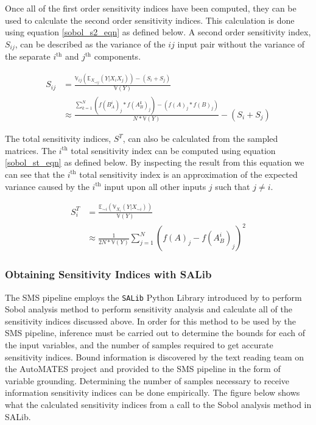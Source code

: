 Once all of the first order sensitivity indices have been computed, they can be used to calculate the second order sensitivity indices. This calculation is done using equation \ref{sobol_s2_eqn} as defined below. A second order sensitivity index, $S_{ij}$, can be described as the variance of the $ij$ input pair without the variance of the separate $i^{\text{th}}$ and $j^{\text{th}}$ components.

\begin{equation} \label{sobol_s2_eqn}
  \begin{split}
    S_{ij} & = \frac{\mathbb{V}_{ij}\left(\mathbb{E}_{X_{\sim ij}}(Y | X_i X_j)\right)  - (S_i + S_j)}{\mathbb{V}(Y)} \\
     & \approx \frac{\sum_{k=1}^{N} \left(f(B_{A}^{i})_j * f(A_{B}^{k})_j\right) - \left(f(A)_j * f(B)_j\right)}{N * \mathbb{V}(Y)} - (S_i + S_j)
  \end{split}
\end{equation}

The total sensitivity indices, $S^T$, can also be calculated from the sampled matrices. The $i^{\text{th}}$ total sensitivity index can be computed using equation \ref{sobol_st_eqn} as defined below. By inspecting the result from this equation we can see that the $i^{\text{th}}$ total sensitivity index is an approximation of the expected variance caused by the $i^{\text{th}}$ input upon all other inputs $j$ such that $j\neq i$.

\begin{equation} \label{sobol_st_eqn}
  \begin{split}
    S_i^T & = \frac{\mathbb{E}_{\sim i}\left(\mathbb{V}_{X_i}(Y | X_{\sim i})\right)}{\mathbb{V}(Y)} \\
    & \approx \frac{1}{2N * \mathbb{V}(Y)} \sum_{j=1}^{N} \left(f(A)_j - f(A_{B}^{i})_j\right)^2
  \end{split}
\end{equation}

\subsubsection{Obtaining Sensitivity Indices with SALib\label{sec:si_analysis}}
The SMS pipeline employs the \texttt{SALib} Python Library introduced by \citet{salib2017} to perform Sobol analysis method to perform sensitivity analysis and calculate all of the sensitivity indices discussed above.
In order for this method to be used by the SMS pipeline, inference must be carried out to determine the bounds for each of the input variables, and the number of samples required to get accurate sensitivity indices.
Bound information is discovered by the text reading team on the AutoMATES project and provided to the SMS pipeline in the form of variable grounding.
Determining the number of samples necessary to receive information sensitivity indices can be done empirically.
The figure below shows what the calculated sensitivity indices from a call to the Sobol analysis method in SALib.

